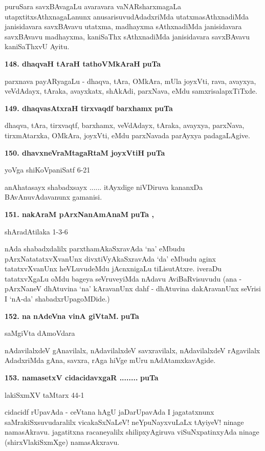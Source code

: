puruSara savxBAvagaLu avaravara vaNARsharxmagaLa utapxtitxsAthxnagaLanunx anusarisuvudAdadxriMda utatxma\-sAthxnadiMda janisidavara savxBAvavu utatxma, madhayxma sAthxna\-diMda janisidavara savxBAvavu madhayxma, kaniSaThx sAthxnadiMda janisidavara savxBAvavu kaniSaThxvU Ayitu.

\medskip
\noindent
\textbf{148. dhaqvaH tAraH tathoVMkAraH} \hfill{\bf puTa \pageref{155}}

\smallskip
parxnava payARyagaLu - dhaqva, tAra, OMkAra, mUla joyxVti, rava, avayxya, veVdAdayx, tAraka, avayxkatx, shAkAdi, parxNava, eMdu samxrisalapxTiTxde.


\smallskip
\noindent
\textbf{149. dhaqvasAtxraH tirxvaqdf barxhamx} \hfill{\bf puTa \pageref{155}}

\smallskip
dhaqva, tAra, tirxvaqtf, barxhamx, veVdAdayx, tAraka, avayxya, parxNava, tirxmAtarxka, OMkAra, joyxVti, eMdu parxNavada parAyxya padagaLAgive.

\medskip
\noindent
\textbf{150. dhavxneVraMtagaRtaM joyxVtiH} \hfill{\bf puTa \pageref{152}}

\hfill{yoVga shiKoVpaniSatf 6-21}

\smallskip
anAhatasayx shabadxsayx ...... itAyxdige niVDiruva kananxDa BAvAnuvAdavanunx gamanisi.


\eject

\noindent
\textbf{151. nakAraM pArxNanAmAnaM} \hfill{\bf puTa \pageref{151}, \pageref{170}}

\hfill{shAradAtilaka 1-3-6}

nAda shabadxdalilx parxthamAkaSxravAda `na' eMbudu pArxNatatatxvXvanUnx divxtiVyAkaSxra\-vAda `da' eMbudu aginx tatatxvXvanUnx heVLuvudeMdu jAcnxnigaLu tiLisutAtxre. iveraDu tatatxvXgaLu oMdu bageya seVruveyiMda nAdavu AviBaRvisuvudu (ana - pArxNaneV dhAtuvina `na' kAravanUnx dahf - dhAtuvina dakAravanUnx seVrisi I `nA-da' shabadxrUpagoMDide.)

\medskip
\noindent
\textbf{152. na nAdeVna vinA giVtaM.} \hfill{\bf puTa \pageref{159}}

\hfill{saMgiVta dAmoVdara}

\smallskip
nAdavilalxdeV gAnavilalx, nAdavilalxdeV savxravilalx, nAdavilalxdeV rAgavilalx AdadxriMda gAna, savxra, rAga hiVge mUru nAdAtamxkavAgide.

\medskip
\noindent
\textbf{153. namasetxV cidacidavxgaR ........} \hfill{\bf puTa \pageref{128}}

\hfill{lakiSxmXV taMtarx 44-1}

\smallskip
cidacidf rUpavAda - ceVtana hAgU jaDarUpavAda I jagatatxnunx saMrakiSx\-suvudaralilx vicakaSxNaLeV! neYpuNayxvuLaLx tAyiyeV! ninage namasAkravu. jagatitxna racaneyalilx shilipxyAgiruva viSuNxpatinxyAda ninage (shirxVlakiSxmXge) namasAkxravu.

